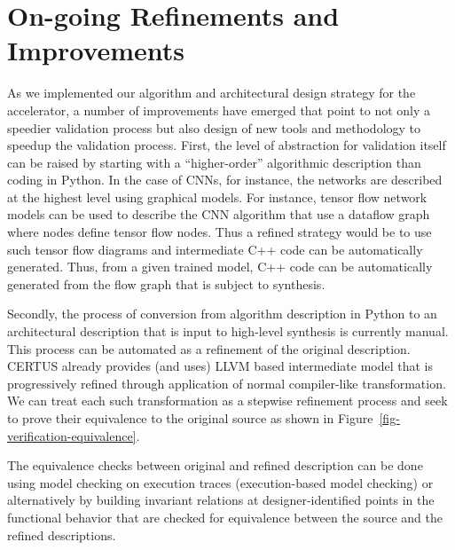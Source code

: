 
\section{On-going Refinements and Improvements}

As we implemented our algorithm and architectural design strategy for the
accelerator, a number of improvements have emerged that point to not only
a speedier validation process but also design of new tools and
methodology to speedup the validation process. First, the level of
abstraction for validation itself can be raised by starting with a
``higher-order'' algorithmic description than coding in Python. In the
case of CNNs, for instance, the networks are described at the highest
level using graphical models. For instance, tensor flow network models
can be used to describe the CNN algorithm that use a dataflow graph where
nodes define tensor flow nodes. Thus a refined strategy would be to use
such tensor flow diagrams and intermediate C++ code can be automatically
generated. Thus, from a given trained model, C++ code can be
automatically generated from the flow graph that is subject to synthesis.

Secondly, the process of conversion from algorithm description in Python
to an architectural description that is input to high-level synthesis is
currently manual. This process can be automated as a refinement of the
original description. CERTUS already provides (and uses) LLVM based
intermediate model that is progressively refined through application of
normal compiler-like transformation. We can treat each such
transformation as a stepwise refinement process and seek to prove their
equivalence to the original source as shown in
Figure~\ref{fig-verification-equivalence}.



The equivalence checks between original and refined description can be
done using model checking on execution traces (execution-based model
checking) or alternatively by building invariant relations at
designer-identified points in the functional behavior that are checked
for equivalence between the source and the refined descriptions.


